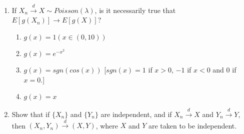 \documentclass[11pt]{article}
\newcommand{\cd}{\stackrel{d}{\rightarrow}}
\begin{document}
\begin{enumerate}
\item If $X_n\stackrel{d}{\rightarrow} X\sim Poisson(\lambda)$, is it necessarily true that $E[g(X_n)]\rightarrow E[g(X)]$?
\begin{enumerate}
	\item $g(x)=1(x\in (0,10))$
	\item $g(x)=e^{-x^2}$
	\item $g(x)=sgn(cos(x))$ [$sgn(x)=1$ if $x>0$, $-1$ if $x<0$ and $0$ if $x=0$.]
	\item $g(x)=x$
\end{enumerate}
\item Show that if $\{X_n\}$ and $\{Y_n\}$ are independent, and if $X_n\cd X$ and $Y_n\cd Y$, then $(X_n,Y_n)\cd (X,Y)$, where $X$ and $Y$ are taken to be independent. 
\end{enumerate}
\end{document}
